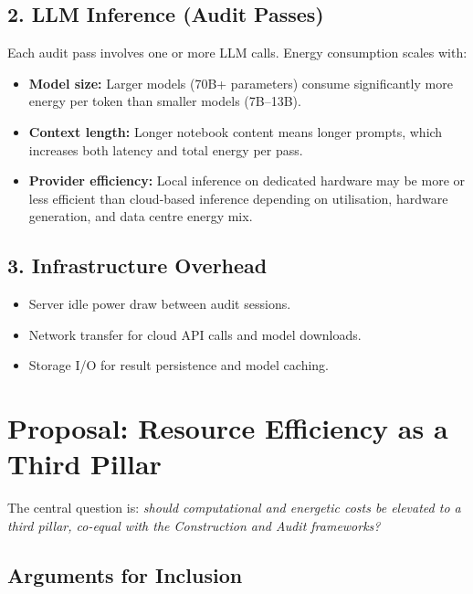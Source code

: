 \documentclass[11pt, a4paper]{article}
\begin{document}
\subsection*{2. LLM Inference (Audit Passes)}

Each audit pass involves one or more LLM calls. Energy consumption scales
with:

\begin{itemize}
  \item \textbf{Model size:} Larger models (70B+ parameters) consume
    significantly more energy per token than smaller models (7B--13B).
  \item \textbf{Context length:} Longer notebook content means longer prompts,
    which increases both latency and total energy per pass.
  \item \textbf{Provider efficiency:} Local inference on dedicated hardware
    may be more or less efficient than cloud-based inference depending on
    utilisation, hardware generation, and data centre energy mix.
\end{itemize}

\subsection*{3. Infrastructure Overhead}

\begin{itemize}
  \item Server idle power draw between audit sessions.
  \item Network transfer for cloud API calls and model downloads.
  \item Storage I/O for result persistence and model caching.
\end{itemize}

\section{Proposal: Resource Efficiency as a Third Pillar}
\label{sec:third-pillar}

The central question is: \textit{should computational and energetic costs be
elevated to a third pillar, co-equal with the Construction and Audit
frameworks?}

\subsection*{Arguments for Inclusion}
\end{document}
